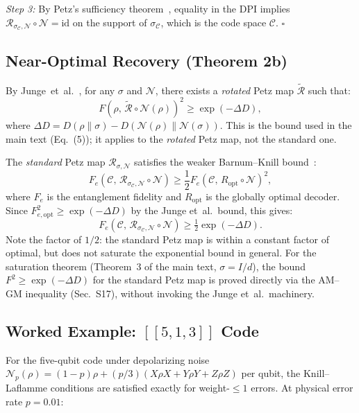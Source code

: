 \documentclass[prl,twocolumn,superscriptaddress,longbibliography]{revtex4-2}
\newcommand{\id}{\mathrm{id}}
\newcommand{\Petz}{\mathcal{R}}
\newcommand{\chan}{\mathcal{N}}
\newcommand{\code}{\mathcal{C}}
\begin{document}
\emph{Step 3:} By Petz's sufficiency theorem~\cite{Petz1988}, equality
in the DPI implies $\Petz_{\sigma_\code,\chan} \circ \chan = \id$ on the
support of $\sigma_\code$, which is the code space $\code$. \hfill$\square$

\subsection{Near-Optimal Recovery (Theorem 2b)}

By Junge~et~al.~\cite{Junge2018}, for any $\sigma$ and $\chan$, there
exists a \emph{rotated} Petz map $\tilde{\Petz}$ such that:
\begin{equation}
F(\rho,\, \tilde{\Petz} \circ \chan(\rho))^2 \geq
\exp(-\Delta D),
\end{equation}
where $\Delta D = D(\rho\|\sigma) - D(\chan(\rho)\|\chan(\sigma))$.
This is the bound used in the main text (Eq.~(5)); it applies to the
\emph{rotated} Petz map, not the standard one.

The \emph{standard} Petz map $\Petz_{\sigma,\chan}$ satisfies the
weaker Barnum--Knill bound~\cite{Barnum2002}:
\begin{equation}
F_e(\code,\, \Petz_{\sigma_\code,\chan} \circ \chan) \geq
\frac{1}{2} F_e(\code,\, R_{\mathrm{opt}} \circ \chan)^2,
\end{equation}
where $F_e$ is the entanglement fidelity and $R_{\mathrm{opt}}$ is the
globally optimal decoder. Since $F_{e,\mathrm{opt}}^2 \geq
\exp(-\Delta D)$ by the Junge et~al.\ bound, this gives:
\begin{equation}
F_e(\code,\, \Petz_{\sigma_\code,\chan} \circ \chan) \geq
\tfrac{1}{2}\exp(-\Delta D).
\end{equation}
Note the factor of $1/2$: the standard Petz map is within a
constant factor of optimal, but does not saturate the exponential
bound in general.  For the saturation theorem
(Theorem~3 of the main text, $\sigma = I/d$), the bound
$F^2 \geq \exp(-\Delta D)$ for the standard Petz map is proved
directly via the AM--GM inequality (Sec.~S17), without invoking the
Junge et~al.\ machinery.

\subsection{Worked Example: $[\![5,1,3]\!]$ Code}

For the five-qubit code under depolarizing noise $\chan_p(\rho) =
(1-p)\rho + (p/3)(X\rho X + Y\rho Y + Z\rho Z)$ per qubit, the
Knill--Laflamme conditions are satisfied exactly for weight-$\leq 1$
errors. At physical error rate $p = 0.01$:
\end{document}
